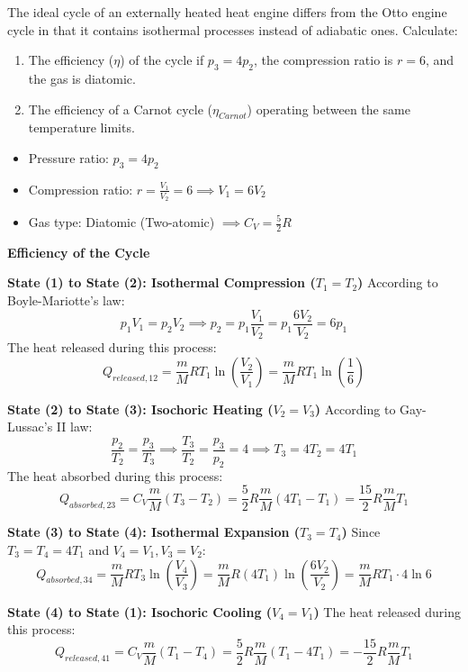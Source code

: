 \documentclass[t,aspectratio=169]{beamer}
\begin{document}
\begin{frame}
\begin{itemize}
\begin{enumerate}
\bigskip

The ideal cycle of an externally heated heat engine differs from the Otto engine cycle in that it contains isothermal processes instead of adiabatic ones. Calculate:
\begin{enumerate}
    \item[a)] The efficiency ($\eta$) of the cycle if $p_3 = 4p_2$, the compression ratio is $r = 6$, and the gas is diatomic.
    \item[b)] The efficiency of a Carnot cycle ($\eta_{Carnot}$) operating between the same temperature limits.
\end{enumerate}

\begin{itemize}
    \item Pressure ratio: $p_3 = 4p_2$
    \item Compression ratio: $r = \frac{V_1}{V_2} = 6 \implies V_1 = 6V_2$
    \item Gas type: Diatomic (Two-atomic) $\implies C_V = \frac{5}{2}R$
\end{itemize}

\textbf{Efficiency of the Cycle}

\textbf{State (1) to State (2): Isothermal Compression ($T_1 = T_2$)}
According to Boyle-Mariotte's law:
$$ p_1 V_1 = p_2 V_2 \implies p_2 = p_1 \frac{V_1}{V_2} = p_1 \frac{6V_2}{V_2} = 6p_1 $$
The heat released during this process:
$$ Q_{released, 12} = \frac{m}{M} R T_1 \ln\left(\frac{V_2}{V_1}\right) = \frac{m}{M} R T_1 \ln\left(\frac{1}{6}\right) $$

\textbf{State (2) to State (3): Isochoric Heating ($V_2 = V_3$)}
According to Gay-Lussac's II law:
$$ \frac{p_2}{T_2} = \frac{p_3}{T_3} \implies \frac{T_3}{T_2} = \frac{p_3}{p_2} = 4 \implies T_3 = 4T_2 = 4T_1 $$
The heat absorbed during this process:
$$ Q_{absorbed, 23} = C_V \frac{m}{M} (T_3 - T_2) = \frac{5}{2} R \frac{m}{M} (4T_1 - T_1) = \frac{15}{2} R \frac{m}{M} T_1 $$

\textbf{State (3) to State (4): Isothermal Expansion ($T_3 = T_4$)}
Since $T_3 = T_4 = 4T_1$ and $V_4 = V_1, V_3 = V_2$:
$$ Q_{absorbed, 34} = \frac{m}{M} R T_3 \ln\left(\frac{V_4}{V_3}\right) = \frac{m}{M} R (4T_1) \ln\left(\frac{6V_2}{V_2}\right) = \frac{m}{M} R T_1 \cdot 4 \ln 6 $$

\textbf{State (4) to State (1): Isochoric Cooling ($V_4 = V_1$)}
The heat released during this process:
$$ Q_{released, 41} = C_V \frac{m}{M} (T_1 - T_4) = \frac{5}{2} R \frac{m}{M} (T_1 - 4T_1) = -\frac{15}{2} R \frac{m}{M} T_1 $$


\end{enumerate}
\end{itemize}
\end{frame}
\end{document}
